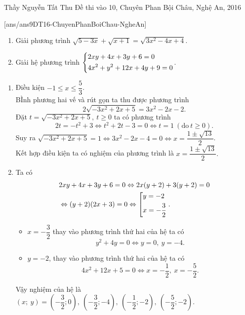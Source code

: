 \begin{name}
{Thầy  Nguyễn Tất Thu}
{Đề thi vào 10, Chuyên Phan Bội Châu, Nghệ An, 2016}
\end{name}
\setcounter{ex}{0}
[ans/ans9DT16-ChuyenPhanBoiChau-NgheAn]
\begin{ex}%
\hfill

   \begin{enumerate}
   \item Giải phương trình $\sqrt{5-3x}+\sqrt{x+1}=\sqrt{3x^{2}-4x+4}$.
             \item Giải hệ phương trình $\left\{\begin{aligned}& 2xy+4x+3y+6=0  \\ & 4x^2+y^2+12x+4y+9=0 \end{aligned}\right.$.

   \end{enumerate}
   \loigiai
    { \begin{enumerate}
    \item Điều kiện $-1 \leq x \leq \dfrac{5}{3}$.\\
    BÌnh phương hai vế và rút gọn ta thu được phương trình
    $$2\sqrt{-3x^2+2x+5}=3x^2-2x-2.$$
    Đặt $t=\sqrt{-3x^2+2x+5},\ t \geq 0$ ta có phương trình
    $$2t=-t^2+3 \Leftrightarrow t^2+2t-3=0 \Leftrightarrow t=1 \ (\text{do}\ t \geq 0).$$
    Suy ra $\sqrt{-3x^2+2x+5}=1 \Leftrightarrow 3x^2-2x-4=0 \Leftrightarrow x=\dfrac{1 \pm \sqrt{13}}{2}$.\\
    Kết hợp điều kiện ta có nghiệm của phương trình là $x=\dfrac{1 \pm \sqrt{13}}{2}.$
    \item Ta có $$\begin{aligned} &2xy+4x+3y+6=0 \Leftrightarrow 2x(y+2)+3(y+2)=0 \\& \Leftrightarrow (y+2)(2x+3)=0 \Leftrightarrow \left[\begin{aligned}&y=-2 \\ & x=-\dfrac{3}{2}\end{aligned}\right.. \end{aligned}$$
    \begin{itemize}
    \item $x=-\dfrac{3}{2}$ thay vào phương trình thứ hai của hệ ta có
    $$y^2+4y =0 \Leftrightarrow y=0,\ y=-4.$$
    \item $y=-2$, thay vào phương trình thứ hai của hệ ta có
    $$4x^2+12x+5=0 \Leftrightarrow x=-\dfrac{1}{2},\ x=-\dfrac{5}{2}.$$ 
    \end{itemize}
    Vậy nghiệm của hệ là $(x;\ y)= \left(-\dfrac{3}{2} ;0 \right),\ \left(-\dfrac{3}{2} ;-4 \right),\ \left(-\dfrac{1}{2} ; -2 \right),\ \left(-\dfrac{5}{2} ;-2 \right)$.
    \end{enumerate}
    }
\end{ex}

